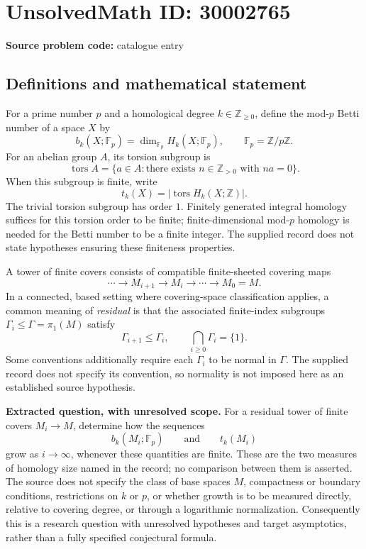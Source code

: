 \documentclass[11pt]{article}
\newcommand{\Z}{\mathbb{Z}}
\newcommand{\F}{\mathbb{F}}
\begin{document}
\section*{UnsolvedMath ID: 30002765}
\textbf{Source problem code:} catalogue entry
\subsection{Definitions and mathematical statement}
For a prime number \(p\) and a homological degree \(k\in\Z_{\geq 0}\), define the mod-\(p\) Betti number of a space \(X\) by
\[
b_k(X;\F_p)=\dim_{\F_p}H_k(X;\F_p),
\qquad \F_p=\Z/p\Z.
\]
For an abelian group \(A\), its torsion subgroup is
\[
\operatorname{tors}A=\{a\in A:\text{there exists }n\in\Z_{>0}\text{ with }na=0\}.
\]
When this subgroup is finite, write
\[
t_k(X)=\bigl|\operatorname{tors}H_k(X;\Z)\bigr|.
\]
The trivial torsion subgroup has order \(1\). Finitely generated integral homology suffices for this torsion order to be finite; finite-dimensional mod-\(p\) homology is needed for the Betti number to be a finite integer. The supplied record does not state hypotheses ensuring these finiteness properties.

A tower of finite covers consists of compatible finite-sheeted covering maps
\[
\cdots\longrightarrow M_{i+1}\longrightarrow M_i\longrightarrow\cdots\longrightarrow M_0=M.
\]
In a connected, based setting where covering-space classification applies, a common meaning of \emph{residual} is that the associated finite-index subgroups \(\Gamma_i\leq\Gamma=\pi_1(M)\) satisfy
\[
\Gamma_{i+1}\leq\Gamma_i,
\qquad \bigcap_{i\geq 0}\Gamma_i=\{1\}.
\]
Some conventions additionally require each \(\Gamma_i\) to be normal in \(\Gamma\). The supplied record does not specify its convention, so normality is not imposed here as an established source hypothesis.

\textbf{Extracted question, with unresolved scope.} For a residual tower of finite covers \(M_i\to M\), determine how the sequences
\[
b_k(M_i;\F_p)
\qquad\text{and}\qquad
t_k(M_i)
\]
grow as \(i\to\infty\), whenever these quantities are finite. These are the two measures of homology size named in the record; no comparison between them is asserted. The source does not specify the class of base spaces \(M\), compactness or boundary conditions, restrictions on \(k\) or \(p\), or whether growth is to be measured directly, relative to covering degree, or through a logarithmic normalization. Consequently this is a research question with unresolved hypotheses and target asymptotics, rather than a fully specified conjectural formula.
\end{document}
